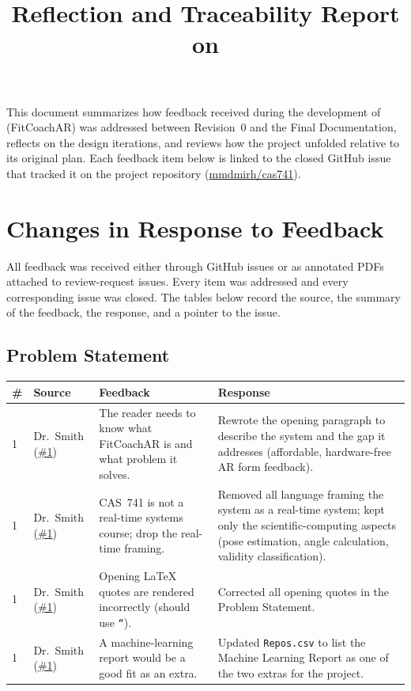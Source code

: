 \documentclass{article}
\title{Reflection and Traceability Report on \progname}
\author{\authname}
\date{}
\begin{document}
\maketitle

This document summarizes how feedback received during the development of
\progname{} (FitCoachAR) was addressed between Revision~0 and the Final
Documentation, reflects on the design iterations, and reviews how the project
unfolded relative to its original plan. Each feedback item below is linked to
the closed GitHub issue that tracked it on the project repository
(\href{https://github.com/mmdmirh/cas741}{mmdmirh/cas741}).

\section{Changes in Response to Feedback}

All feedback was received either through GitHub issues or as annotated PDFs
attached to review-request issues. Every item was addressed and every
corresponding issue was closed. The tables below record the source, the
summary of the feedback, the response, and a pointer to the issue.

\subsection{Problem Statement}

\begin{longtable}{p{} p{} p{} p{}}
\toprule
\textbf{\#} & \textbf{Source} & \textbf{Feedback} & \textbf{Response}\\
\midrule
\endhead
1 & Dr.~Smith (\href{https://github.com/mmdmirh/cas741/issues/1}{\#1}) &
The reader needs to know what FitCoachAR is and what problem it solves. &
Rewrote the opening paragraph to describe the system and the gap it addresses
(affordable, hardware-free AR form feedback).\\
1 & Dr.~Smith (\href{https://github.com/mmdmirh/cas741/issues/1}{\#1}) &
CAS~741 is not a real-time systems course; drop the real-time framing. &
Removed all language framing the system as a real-time system; kept only the
scientific-computing aspects (pose estimation, angle calculation, validity
classification).\\
1 & Dr.~Smith (\href{https://github.com/mmdmirh/cas741/issues/1}{\#1}) &
Opening LaTeX quotes are rendered incorrectly (should use \texttt{``}). &
Corrected all opening quotes in the Problem Statement.\\
1 & Dr.~Smith (\href{https://github.com/mmdmirh/cas741/issues/1}{\#1}) &
A machine-learning report would be a good fit as an extra. &
Updated \texttt{Repos.csv} to list the Machine Learning Report as one of the
two extras for the project.\\
\bottomrule
\end{longtable}
\end{document}
